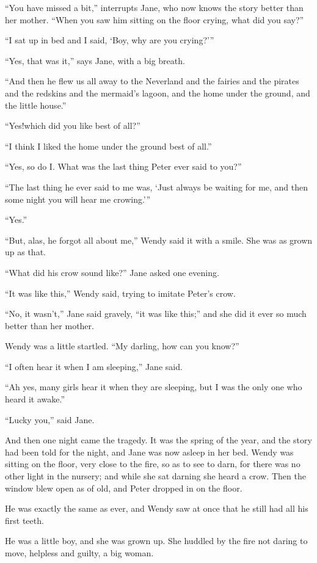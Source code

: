 “You have missed a bit,” interrupts Jane,
who now knows the story better than her mother.
“When you saw him sitting on the floor crying, what did you say?”

“I sat up in bed and I said, ‘Boy, why are you crying?’”

“Yes, that was it,” says Jane, with a big breath.

“And then he flew us all away to the Neverland
and the fairies and the pirates and the redskins and the mermaid’s lagoon,
and the home under the ground, and the little house.”

“Yes!\@ which did you like best of all?”

“I think I liked the home under the ground best of all.”

“Yes, so do I\@.
What was the last thing Peter ever said to you?”

“The last thing he ever said to me was,
‘Just always be waiting for me, and then some night you will hear me crowing.’”

“Yes.”

“But, alas, he forgot all about me,” Wendy said it with a smile.
She was as grown up as that.

“What did his crow sound like?\@” Jane asked one evening.

“It was like this,” Wendy said, trying to imitate Peter’s crow.

“No, it wasn’t,” Jane said gravely, “it was like this;”
and she did it ever so much better than her mother.

Wendy was a little startled.
“My darling, how can you know?”

“I often hear it when I am sleeping,” Jane said.

“Ah yes, many girls hear it when they are sleeping,
but I was the only one who heard it awake.”

“Lucky you,” said Jane.

And then one night came the tragedy.
It was the spring of the year, and the story had been told for the night,
and Jane was now asleep in her bed.
Wendy was sitting on the floor, very close to the fire, so as to see to darn,
for there was no other light in the nursery;
and while she sat darning she heard a crow.
Then the window blew open as of old, and Peter dropped in on the floor.

He was exactly the same as ever, and Wendy saw at once that he still had all his first teeth.

He was a little boy, and she was grown up.
She huddled by the fire not daring to move, helpless and guilty, a big woman.

